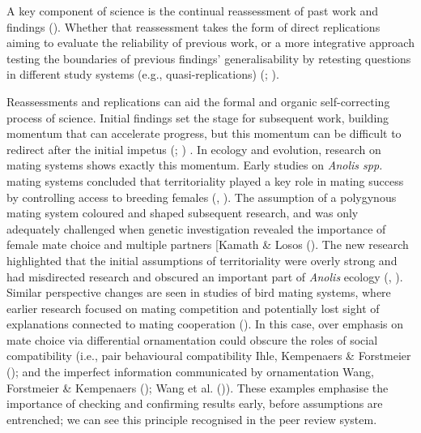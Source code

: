 \documentclass[10pt,a4paper]{article}
\begin{document}
A key component of science is the continual reassessment of past work and findings ().
Whether that reassessment takes the form of direct replications aiming to evaluate the reliability of previous work, or a more integrative approach testing the boundaries of previous findings' generalisability by retesting questions in different study systems (e.g., quasi-replications) (; ).

Reassessments and replications can aid the formal and organic self-correcting process of science.
Initial findings set the stage for subsequent work, building momentum that can accelerate progress, but this momentum can be difficult to redirect after the initial impetus (; ) .
In ecology and evolution, research on mating systems shows exactly this momentum.
Early studies on \emph{Anolis spp.} mating systems concluded that territoriality played a key role in mating success by controlling access to breeding females (, ).
The assumption of a polygynous mating system coloured and shaped subsequent research, and was only adequately challenged when genetic investigation revealed the importance of female mate choice and multiple partners {[}Kamath \& Losos ().
The new research highlighted that the initial assumptions of territoriality were overly strong and had misdirected research and obscured an important part of \emph{Anolis} ecology (, ).
Similar perspective changes are seen in studies of bird mating systems, where earlier research focused on mating competition and potentially lost sight of explanations connected to mating cooperation ().
In this case, over emphasis on mate choice via differential ornamentation could obscure the roles of social compatibility (i.e., pair behavioural compatibility Ihle, Kempenaers \& Forstmeier (); and the imperfect information communicated by ornamentation Wang, Forstmeier \& Kempenaers (); Wang et al. ()).
These examples emphasise the importance of checking and confirming results early, before assumptions are entrenched; we can see this principle recognised in the peer review system.
\end{document}
